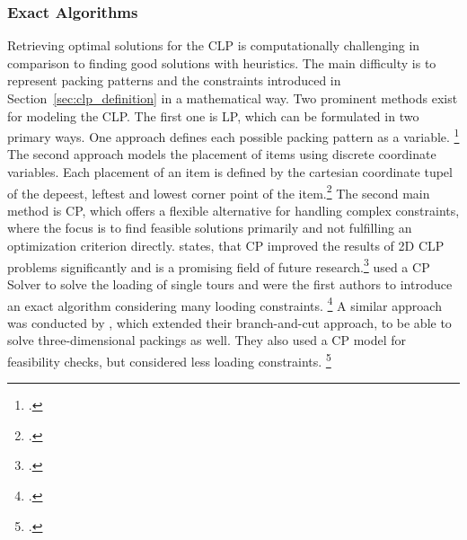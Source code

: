 \subsubsection{Exact Algorithms}
Retrieving optimal solutions for the \gls{CLP} is computationally challenging in comparison
to finding good solutions with heuristics. The main difficulty is to represent packing
patterns and the constraints introduced in Section~\ref{sec:clp_definition} in a mathematical way.
Two prominent methods exist for modeling the \gls{CLP}. The first one is \gls{LP}, which can be
formulated in two primary ways. One approach defines each possible packing pattern as
a variable. \footcite[cf.][pp. 29--30]{zhu_prototype_2012} The second approach models
the placement of items using discrete coordinate variables. Each placement of an item
is defined by the cartesian coordinate tupel of the depeest, leftest and lowest corner point of
the item.\footcites[cf.][pp. 649-653]{junqueira_optimization_2013}[cf.][pp. 4--8]{moura_integrated_2009}
The second main method is \gls{CP}, which offers a flexible alternative for handling
complex constraints, where the focus is to find feasible solutions primarily and
not fulfilling an optimization criterion directly. \textcite{iori_exact_2021} states, that
\gls{CP} improved the results of 2D \gls{CLP} problems significantly and is a promising
field of future research.\footcite[cf.][p. 23]{iori_exact_2021} \cite{tamke_branch-and-cut_2024} used a \gls{CP} Solver
to solve the loading of single tours and were the first authors to introduce an exact algorithm
considering many looding constraints. \footcite[cf.][pp. 7--11]{tamke_branch-and-cut_2024}
A similar approach was conducted by \cite{hokama_branch-and-cut_2016}, which extended their
branch-and-cut approach, to be able to solve three-dimensional packings as well.
They also used a \gls{CP} model for feasibility checks, but considered less loading constraints. \footcite[cf.][]{hokama_branch-and-cut_2016}

\parbreak

